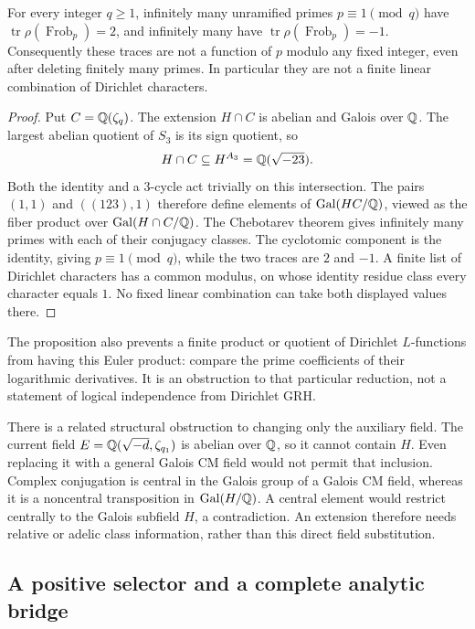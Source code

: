 \begin{proposition}\label{prop:modulus-obstruction}
For every integer $q\geq1$, infinitely many unramified primes
$p\equiv1\pmod q$ have $\operatorname{tr}\rho(\operatorname{Frob}_p)=2$,
and infinitely many have
$\operatorname{tr}\rho(\operatorname{Frob}_p)=-1$.
Consequently these traces are not a function of $p$ modulo any fixed
integer, even after deleting finitely many primes. In particular they
are not a finite linear combination of Dirichlet characters.
\end{proposition}

\begin{proof}
Put $C=\mathbb Q(\zeta_q)$. The extension $H\cap C$ is abelian and Galois over
$\mathbb Q$. The largest abelian quotient of $S_3$ is its sign quotient, so
\[
 H\cap C\subseteq H^{A_3}=\mathbb Q(\sqrt{-23}).
\]
Both the identity and a $3$-cycle act trivially on this intersection.
The pairs $(1,1)$ and $((123),1)$ therefore define elements of
$\operatorname{Gal}(HC/\mathbb Q)$, viewed as the fiber product over
$\operatorname{Gal}(H\cap C/\mathbb Q)$. The Chebotarev theorem gives infinitely
many primes with each of their conjugacy classes. The cyclotomic
component is the identity, giving $p\equiv1\pmod q$, while the two traces
are $2$ and $-1$. A finite list of Dirichlet characters has a common
modulus, on whose identity residue class every character equals $1$.
No fixed linear combination can take both displayed values there.
\end{proof}

The proposition also prevents a finite product or quotient of Dirichlet
$L$-functions from having this Euler product: compare the prime
coefficients of their logarithmic derivatives. It is an obstruction to
that particular reduction, not a statement of logical independence from
Dirichlet GRH.

There is a related structural obstruction to changing only the auxiliary
field. The current field $E=\mathbb Q(\sqrt{-d},\zeta_{q_1})$ is abelian over
$\mathbb Q$, so it cannot contain $H$. Even replacing it with a general Galois
CM field would not permit that inclusion. Complex conjugation is central
in the Galois group of a Galois CM field, whereas it is a noncentral
transposition in $\operatorname{Gal}(H/\mathbb Q)$. A central element would
restrict centrally to the Galois subfield $H$, a contradiction. An
extension therefore needs relative or adelic class information, rather
than this direct field substitution.

\subsection{A positive selector and a complete analytic bridge}

